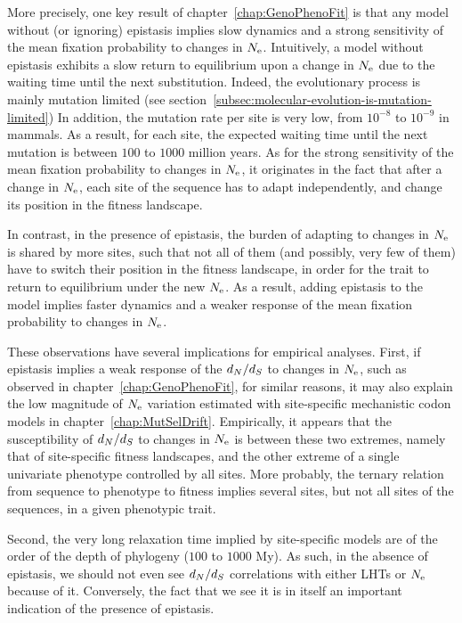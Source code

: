 More precisely, one key result of chapter~\ref{chap:GenoPhenoFit} is that any model without (or ignoring) epistasis implies slow dynamics and a strong sensitivity of the mean fixation probability to changes in $N_{\text{e}}$.
Intuitively, a model without epistasis exhibits a slow return to equilibrium upon a change in $N_{\text{e}}$ due to the waiting time until the next \gls{substitution}.
Indeed, the evolutionary process is mainly mutation limited (see section~\ref{subsec:molecular-evolution-is-mutation-limited})
In addition, the mutation rate per site is very low, from $10^{-8}$ to $10^{-9}$ in mammals.
As a result, for each site, the expected waiting time until the next mutation is between $100$ to $1000$ million years.
As for the strong sensitivity of the mean fixation probability to changes in $N_{\text{e}}$, it originates in the fact that after a change in $N_{\text{e}}$, each site of the sequence has to adapt independently, and change its position in the fitness landscape.

In contrast, in the presence of epistasis, the burden of adapting to changes in $N_{\text{e}}$ is shared by more sites, such that not all of them (and possibly, very few of them) have to switch their position in the fitness landscape, in order for the trait to return to equilibrium under the new $N_{\text{e}}$.
As a result, adding epistasis to the model implies faster dynamics and a weaker response of the mean fixation probability to changes in $N_{\text{e}}$.

These observations have several implications for empirical analyses.
First, if epistasis implies a weak response of the $d_N / d_S$ to changes in $N_{\text{e}}$, such as observed in chapter~\ref{chap:GenoPhenoFit}, for similar reasons, it may also explain the low magnitude of $N_{\text{e}}$ variation estimated with site-specific mechanistic \gls{codon} models in chapter~\ref{chap:MutSelDrift}.
Empirically, it appears that the susceptibility of $d_N / d_S$ to changes in $N_{\text{e}}$ is between these two extremes, namely that of site-specific fitness landscapes, and the other extreme of a single univariate \gls{phenotype} controlled by all sites.
More probably, the ternary relation from sequence to \gls{phenotype} to fitness implies several sites, but not all sites of the sequences, in a given phenotypic trait.

Second, the very long relaxation time implied by site-specific models are of the order of the depth of phylogeny ($100$ to $1000$ My).
As such, in the absence of epistasis, we should not even see $d_N / d_S$ correlations with either \acrshort{LHT}s or $N_{\text{e}}$ because of it.
Conversely, the fact that we see it is in itself an important indication of the presence of epistasis.

